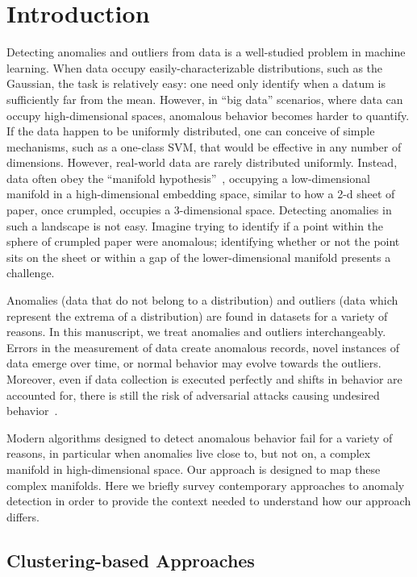 \section{Introduction}
\label{sec:introduction}

Detecting anomalies and outliers from data is a well-studied problem in machine learning.
When data occupy easily-characterizable distributions, such as the Gaussian, the task is relatively easy:
one need only identify when a datum is sufficiently far from the mean.
However, in ``big data'' scenarios, where data can occupy high-dimensional spaces, anomalous behavior becomes harder to quantify.
If the data happen to be uniformly distributed, one can conceive of simple mechanisms, such as a one-class SVM, that would be effective in any number of dimensions.
However, real-world data are rarely distributed uniformly.
Instead, data often obey the ``manifold hypothesis''~\cite{fefferman2016testing}, occupying a low-dimensional manifold in a high-dimensional embedding space, similar to how a 2-d sheet of paper, once crumpled, occupies a 3-dimensional space.
Detecting anomalies in such a landscape is not easy.
Imagine trying to identify if a point within the sphere of crumpled paper were anomalous; identifying whether or not the point sits on the sheet or within a gap of the lower-dimensional manifold presents a challenge.

Anomalies (data that do not belong to a distribution) and outliers (data which represent the extrema of a distribution) are found in datasets for a variety of reasons.
In this manuscript, we treat anomalies and outliers interchangeably.
Errors in the measurement of data create anomalous records,
novel instances of data emerge over time,
or normal behavior may evolve towards the outliers.
Moreover, even if data collection is executed perfectly and shifts in behavior are accounted for, there is still the risk of adversarial attacks causing undesired behavior~\cite{elsayed2018adversarial}.

Modern algorithms designed to detect anomalous behavior fail for a variety of reasons, in particular when anomalies live close to, but not on, a complex manifold in high-dimensional space.
Our approach is designed to map these complex manifolds.
Here we briefly survey contemporary approaches to anomaly detection in order to provide the context needed to understand how our approach differs.

\subsection{Clustering-based Approaches}
\label{subsec:introduction:clustering-based-approaches}

